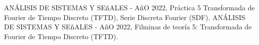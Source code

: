 \documentclass[letterpaper, 10 pt, conference]{ieeeconf}  %
\newcommand{\image}[2] {
  \begin{figure}[H]
    \centering
    \texttt{[image: ../figures/\#1.png]}
    \caption{#2}
    \label{fig:#1}
  \end{figure}
}
\begin{document}
% 
% 
% 

\begin{thebibliography}{99}

ANÁLISIS DE SISTEMAS Y SE\~{n}ALES - A\~{n}O 2022, Práctica 5 Transformada de Fourier de Tiempo Discreto (TFTD), Serie Discreta Fourier (SDF).
ANÁLISIS DE SISTEMAS Y SE\~{n}ALES - A\~{n}O 2022, Filminas de teor\'ia 5: Transformada de Fourier de Tiempo Discreto (TFTD).

\end{thebibliography}
\end{document}
